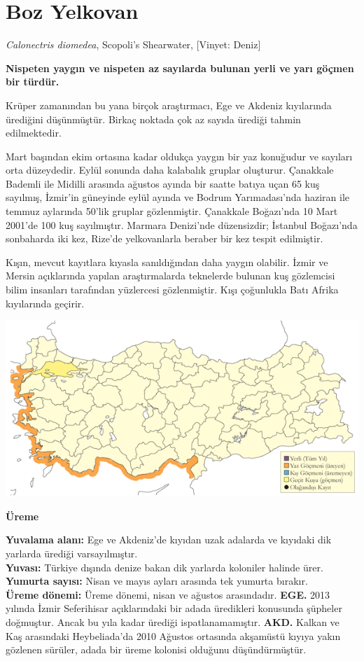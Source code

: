 \documentclass[
  a4paper,
  DIV=11,
  numbers=noendperiod]{scrreprt}
\begin{document}
\section{Boz Yelkovan}\label{boz-yelkovan}

\emph{Calonectris diomedea}, Scopoli's Shearwater, {[}Vinyet: Deniz{]}

\textbf{Nispeten yaygın ve nispeten az sayılarda bulunan yerli ve yarı
göçmen bir türdür.}

Krüper zamanından bu yana birçok araştırmacı, Ege ve Akdeniz kıyılarında
ürediğini düşünmüştür. Birkaç noktada çok az sayıda ürediği tahmin
edilmektedir.

Mart başından ekim ortasına kadar oldukça yaygın bir yaz konuğudur ve
sayıları orta düzeydedir. Eylül sonunda daha kalabalık gruplar
oluşturur. Çanakkale Bademli ile Midilli arasında ağustos ayında bir
saatte batıya uçan 65 kuş sayılmış, İzmir'in güneyinde eylül ayında ve
Bodrum Yarımadası'nda haziran ile temmuz aylarında 50'lik gruplar
gözlenmiştir. Çanakkale Boğazı'nda 10 Mart 2001'de 100 kuş sayılmıştır.
Marmara Denizi'nde düzensizdir; İstanbul Boğazı'nda sonbaharda iki kez,
Rize'de yelkovanlarla beraber bir kez tespit edilmiştir.

Kışın, mevcut kayıtlara kıyasla sanıldığından daha yaygın olabilir.
İzmir ve Mersin açıklarında yapılan araştırmalarda teknelerde bulunan
kuş gözlemcisi bilim insanları tarafından yüzlercesi gözlenmiştir. Kışı
çoğunlukla Batı Afrika kıyılarında geçirir.

\includegraphics{images/harita_Page_048.png}

\textbf{Üreme}

\textbf{Yuvalama alanı:} Ege ve Akdeniz'de kıyıdan uzak adalarda ve
kıyıdaki dik yarlarda ürediği varsayılmıştır.\\
\textbf{Yuvası:} Türkiye dışında denize bakan dik yarlarda koloniler
halinde ürer.\\
\textbf{Yumurta sayısı:} Nisan ve mayıs ayları arasında tek yumurta
bırakır.\\
\textbf{Üreme dönemi:} Üreme dönemi, nisan ve ağustos arasındadır.
\textbf{EGE.} 2013 yılında İzmir Seferihisar açıklarındaki bir adada
üredikleri konusunda şüpheler doğmuştur. Ancak bu yıla kadar ürediği
ispatlanamamıştır. \textbf{AKD.} Kalkan ve Kaş arasındaki Heybeliada'da
2010 Ağustos ortasında akşamüstü kıyıya yakın gözlenen sürüler, adada
bir üreme kolonisi olduğunu düşündürmüştür.
\end{document}

